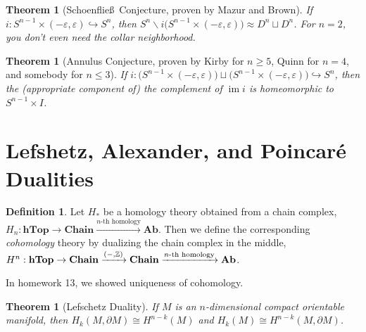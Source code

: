 \documentclass[12pt]{article}
\theoremstyle{plain}
\newtheorem{theorem}[equation]{Theorem}
\theoremstyle{definition}
\newtheorem{definition}[equation]{Definition}
\theoremstyle{remark}
\let\hom\relax %
\DeclareMathOperator{\hom}{Hom}
\DeclareMathOperator{\im}{im}
\newcommand{\ZZ}{\ensuremath{\mathbb{Z}}}
\begin{document}
 \begin{theorem}[Schoenflie\ss\ Conjecture, proven by Mazur and Brown]
   If $i:S^{n-1}\times (-\varepsilon,\varepsilon)\hookrightarrow S^n$, then
   $S^n\smallsetminus i\bigl( S^{n-1}\times (-\varepsilon,\varepsilon)\bigr) \approx
   D^n\sqcup D^n$. For $n=2$, you don't even need the collar neighborhood.
 \end{theorem}
 \begin{theorem}[Annulus Conjecture, proven by Kirby for $n\ge 5$, Quinn for $n=4$, and somebody for $n\le 3$]
   If $i:\bigl(S^{n-1}\times (-\varepsilon,\varepsilon)\bigr) \sqcup (S^{n-1}\times
   (-\varepsilon,\varepsilon)\bigr) \hookrightarrow S^n$, then the (appropriate component
   of) the complement of $\im i$ is homeomorphic to $S^{n-1}\times I$.
 \end{theorem}

 \section{Lefshetz, Alexander, and Poincar\'e Dualities}

 \begin{definition}
   Let $H_*$ be a homology theory obtained from a chain complex, $H_n:\textbf{hTop}\to
   \textbf{Chain}\xrightarrow{n\text{-th homology}} \textbf{Ab}$. Then we define the
   corresponding \emph{cohomology} theory by dualizing the chain complex in the middle,
   $H^n:\textbf{hTop}\to \textbf{Chain}\xrightarrow{\hom(-,\ZZ)}
   \textbf{Chain}\xrightarrow{n\text{-th homology}} \textbf{Ab}$.
 \end{definition}
 In homework 13, we showed uniqueness of cohomology.

 \begin{theorem}[Lefschetz Duality]
   If $M$ is an $n$-dimensional compact orientable manifold, then $H_k(M,\partial M)\cong
   H^{n-k}(M)$ and $H_k(M)\cong H^{n-k}(M,\partial M)$.
 \end{theorem}
\end{document}
